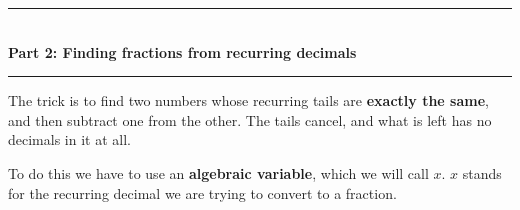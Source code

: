 \documentclass[12pt,a4paper]{article}
\newcommand{\ansline}[1][2.2cm]{\underline{\hspace{#1}}}
\newcommand{\heading}[1]{%
  \vspace{2pt}
  {\color{blue!45!black}\rule{\linewidth}{1pt}}\\[1pt]
  {\large\bfseries #1}\\[-6pt]
  {\color{blue!45!black}\rule{\linewidth}{0.4pt}}
  \vspace{2pt}}
\newcommand{\parttitle}[2]{\heading{Part #1: #2}}
\begin{document}



\newpage

\parttitle{2}{Finding fractions from recurring decimals}

The trick is to find two numbers whose recurring tails are
\textbf{exactly the same}, and then subtract one from the other. The tails
cancel, and what is left has no decimals in it at all.

To do this we have to use an \textbf{algebraic variable}, which we will call $x$. $x$ stands for the recurring decimal we are trying to convert to a fraction.
\end{document}
